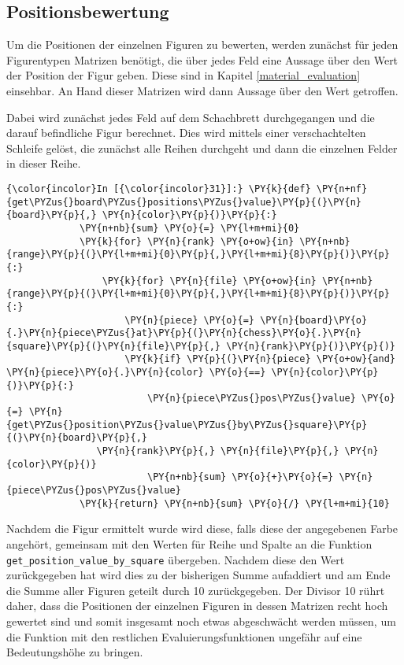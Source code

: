     \subsection{Positionsbewertung}\label{positionsbewertung}

Um die Positionen der einzelnen Figuren zu bewerten, werden zunächst für
jeden Figurentypen Matrizen benötigt, die über jedes Feld eine Aussage
über den Wert der Position der Figur geben. Diese sind in Kapitel \ref{material_evaluation}
einsehbar. An Hand dieser Matrizen wird dann Aussage über den Wert
getroffen.

    Dabei wird zunächst jedes Feld auf dem Schachbrett durchgegangen und die
darauf befindliche Figur berechnet. Dies wird mittels einer
verschachtelten Schleife gelöst, die zunächst alle Reihen durchgeht und
dann die einzelnen Felder in dieser Reihe.

    \begin{Verbatim}[commandchars=\\\{\}]
{\color{incolor}In [{\color{incolor}31}]:} \PY{k}{def} \PY{n+nf}{get\PYZus{}board\PYZus{}positions\PYZus{}value}\PY{p}{(}\PY{n}{board}\PY{p}{,} \PY{n}{color}\PY{p}{)}\PY{p}{:}
             \PY{n+nb}{sum} \PY{o}{=} \PY{l+m+mi}{0}
             \PY{k}{for} \PY{n}{rank} \PY{o+ow}{in} \PY{n+nb}{range}\PY{p}{(}\PY{l+m+mi}{0}\PY{p}{,}\PY{l+m+mi}{8}\PY{p}{)}\PY{p}{:}
                 \PY{k}{for} \PY{n}{file} \PY{o+ow}{in} \PY{n+nb}{range}\PY{p}{(}\PY{l+m+mi}{0}\PY{p}{,}\PY{l+m+mi}{8}\PY{p}{)}\PY{p}{:}
                     \PY{n}{piece} \PY{o}{=} \PY{n}{board}\PY{o}{.}\PY{n}{piece\PYZus{}at}\PY{p}{(}\PY{n}{chess}\PY{o}{.}\PY{n}{square}\PY{p}{(}\PY{n}{file}\PY{p}{,} \PY{n}{rank}\PY{p}{)}\PY{p}{)}
                     \PY{k}{if} \PY{p}{(}\PY{n}{piece} \PY{o+ow}{and} \PY{n}{piece}\PY{o}{.}\PY{n}{color} \PY{o}{==} \PY{n}{color}\PY{p}{)}\PY{p}{:}
                         \PY{n}{piece\PYZus{}pos\PYZus{}value} \PY{o}{=} \PY{n}{get\PYZus{}position\PYZus{}value\PYZus{}by\PYZus{}square}\PY{p}{(}\PY{n}{board}\PY{p}{,} 
				\PY{n}{rank}\PY{p}{,} \PY{n}{file}\PY{p}{,} \PY{n}{color}\PY{p}{)}
                         \PY{n+nb}{sum} \PY{o}{+}\PY{o}{=} \PY{n}{piece\PYZus{}pos\PYZus{}value}
             \PY{k}{return} \PY{n+nb}{sum} \PY{o}{/} \PY{l+m+mi}{10}
\end{Verbatim}

    Nachdem die Figur ermittelt wurde wird diese, falls diese der
angegebenen Farbe angehört, gemeinsam mit den Werten für Reihe und
Spalte an die Funktion \texttt{get\_position\_value\_by\_square}
übergeben. Nachdem diese den Wert zurückgegeben hat wird dies zu der
bisherigen Summe aufaddiert und am Ende die Summe aller Figuren geteilt
durch 10 zurückgegeben. Der Divisor 10 rührt daher, dass die Positionen
der einzelnen Figuren in dessen Matrizen recht hoch gewertet sind und
somit insgesamt noch etwas abgeschwächt werden müssen, um die Funktion
mit den restlichen Evaluierungsfunktionen ungefähr auf eine
Bedeutungshöhe zu bringen.

